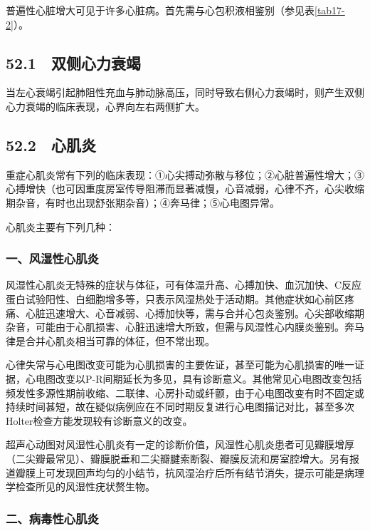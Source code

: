 普遍性心脏增大可见于许多心脏病。首先需与心包积液相鉴别（参见表\ref{tab17-2}）。

\subsection{52.1　双侧心力衰竭}

当左心衰竭引起肺阻性充血与肺动脉高压，同时导致右侧心力衰竭时，则产生双侧心力衰竭的临床表现，心界向左右两侧扩大。

\protect\hypertarget{text00138.html}{}{}

\subsection{52.2　心肌炎}

重症心肌炎常有下列的临床表现：①心尖搏动弥散与移位；②心脏普遍性增大；③心搏增快（也可因重度房室传导阻滞而显著减慢，心音减弱，心律不齐，心尖收缩期杂音，有时也出现舒张期杂音）；④奔马律；⑤心电图异常。

心肌炎主要有下列几种：

\subsubsection{一、风湿性心肌炎}

风湿性心肌炎无特殊的症状与体征，可有体温升高、心搏加快、血沉加快、C反应蛋白试验阳性、白细胞增多等，只表示风湿热处于活动期。其他症状如心前区疼痛、心脏迅速增大、心音减弱、心搏加快等，需与合并心包炎鉴别。心尖部收缩期杂音，可能由于心肌损害、心脏迅速增大所致，但需与风湿性心内膜炎鉴别。奔马律是合并心肌炎相当可靠的体征，但不常出现。

心律失常与心电图改变可能为心肌损害的主要佐证，甚至可能为心肌损害的唯一证据，心电图改变以P-R间期延长为多见，具有诊断意义。其他常见心电图改变包括频发性多源性期前收缩、二联律、心房扑动或纤颤，由于心电图改变有时不固定或持续时间甚短，故在疑似病例应在不同时期反复进行心电图描记对比，甚至多次Holter检查方能发现较有诊断意义的改变。

超声心动图对风湿性心肌炎有一定的诊断价值，风湿性心肌炎患者可见瓣膜增厚（二尖瓣最常见）、瓣膜脱垂和二尖瓣腱索断裂、瓣膜反流和房室腔增大。另有报道瓣膜上可发现回声均匀的小结节，抗风湿治疗后所有结节消失，提示可能是病理学检查所见的风湿性疣状赘生物。

\subsubsection{二、病毒性心肌炎}

